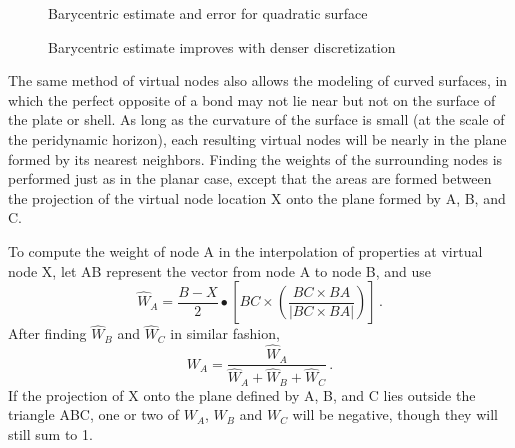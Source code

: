 \begin{figure}[htbp]
  \centering
  \resizebox{0.8\linewidth}{!}{}
  \caption{Barycentric estimate and error for quadratic surface}
  \label{fig:baryPatch}
\end{figure}

\begin{figure}[htbp]
  \centering
  \resizebox{0.8\linewidth}{!}{}
  \caption{Barycentric estimate improves with denser discretization}
  \label{fig:baryPatch2}
\end{figure}

The same method of virtual nodes also allows the modeling of curved surfaces, in which the perfect opposite of a bond may not lie near but not on the surface of the plate or shell.
As long as the curvature of the surface is small (at the scale of the peridynamic horizon), each resulting virtual nodes will be nearly in the plane formed by its nearest neighbors.
Finding the weights of the surrounding nodes is performed just as in the planar case, except that the areas are formed between the projection of the virtual node location X onto the plane formed by A, B, and C.

%  

To compute the weight of node A in the interpolation of properties at virtual node X, let AB represent the vector from node A to node B, and use
%
\begin{equation}
\label{eq:BarycentricArea}
\hat{W}_A = \frac{B-X}{2}\bullet \left[BC \times \left(\frac{BC \times BA}{|BC \times BA|}\right)\right]\, .
\end{equation}
%
After finding $\hat{W}_B$ and $\hat{W}_C$ in similar fashion,
%
\begin{equation}
\label{eq:BarycentricWeight}
W_A = \frac{\hat{W}_A }{\hat{W}_A + \hat{W}_B + \hat{W}_C}\, .
\end{equation}
%
If the projection of X onto the plane defined by A, B, and C lies outside the triangle ABC,  one or two of $W_A$, $W_B$ and $W_C$ will be negative, though they will still sum to 1.

